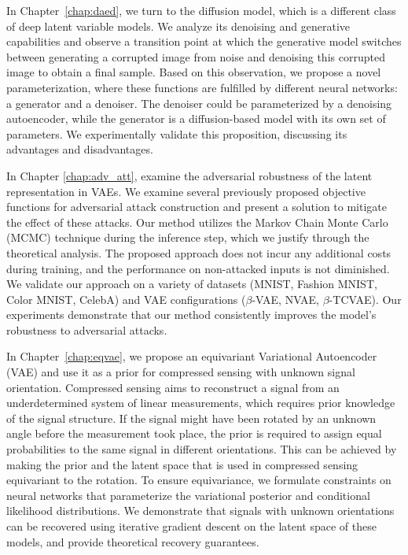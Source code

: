 In Chapter~\ref{chap:daed}, we turn to the diffusion model, which is a different class of deep latent variable models. 
We analyze its denoising and generative capabilities and observe a transition point at which the generative model switches between generating a corrupted image from noise and denoising this corrupted image to obtain a final sample. 
Based on this observation, we propose a novel parameterization, where these functions are fulfilled by different neural networks: a generator and a denoiser.
The denoiser could be parameterized by a denoising autoencoder, while the generator is a diffusion-based model with its own set of parameters. 
We experimentally validate this proposition, discussing its advantages and disadvantages.


In Chapter \ref{chap:adv_att}, examine the adversarial robustness of the latent representation in VAEs.
We examine several previously proposed objective functions for adversarial attack construction and present a solution to mitigate the effect of these attacks. 
Our method utilizes the Markov Chain Monte Carlo (MCMC) technique during the inference step, which we justify through the theoretical analysis. 
The proposed approach does not incur any additional costs during training, and the performance on non-attacked inputs is not diminished. 
We validate our approach on a variety of datasets (MNIST, Fashion MNIST, Color MNIST, CelebA) and VAE configurations ($\beta$-VAE, NVAE, $\beta$-TCVAE).
Our experiments demonstrate that our method consistently improves the model's robustness to adversarial attacks.


In Chapter~\ref{chap:eqvae}, we propose an equivariant Variational Autoencoder (VAE) and use it as a prior for compressed sensing with unknown signal orientation. 
Compressed sensing aims to reconstruct a signal from an underdetermined system of linear measurements, which requires prior knowledge of the signal structure. 
If the signal might have been rotated by an unknown angle before the measurement took place, the prior is required to assign equal probabilities to the same signal in different orientations. 
This can be achieved by making the prior and the latent space that is used in compressed sensing equivariant to the rotation. 
To ensure equivariance, we formulate constraints on neural networks that parameterize the variational posterior and conditional likelihood distributions. 
We demonstrate that signals with unknown orientations can be recovered using iterative gradient descent on the latent space of these models, and provide theoretical recovery guarantees.



